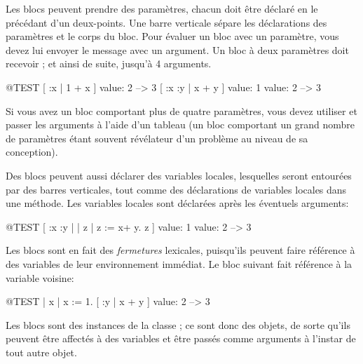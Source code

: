 \documentclass[a4paper,10pt,twoside]{book}
\begin{document}
Les blocs peuvent prendre des param\`etres, chacun doit \^etre
d\'eclar\'e en le précédant d'un deux-points.
Une barre verticale s\'{e}pare les d\'{e}clarations des param\`{e}tres
et le corps du bloc.
Pour \'evaluer un bloc avec un param\`{e}tre, vous devez lui envoyer le message 
  avec un argument.
Un bloc \`{a} deux param\`etres doit recevoir  ; et ainsi de suite, jusqu'\`a 4 arguments.

\begin{code}{@TEST}
[ :x | 1 + x ] value: 2 --> 3
[ :x :y | x + y ] value: 1 value: 2 --> 3
\end{code}

Si vous avez un bloc comportant plus de quatre param\`{e}tres, vous devez utiliser
 et passer les arguments à
l'aide d'un tableau (un bloc comportant un grand nombre de param\`{e}tres étant souvent r\'{e}v\'{e}lateur d'un probl\`{e}me au niveau de sa conception).

Des blocs peuvent aussi d\'{e}clarer des variables locales, lesquelles seront entour\'{e}es par des barres verticales, tout comme des d\'{e}clarations de variables locales dans une m\'{e}thode.
Les variables locales sont d\'{e}clar\'{e}es apr\`{e}s les éventuels
arguments:

\begin{code}{@TEST}
[ :x :y | | z | z := x+ y. z ] value: 1 value: 2 --> 3
\end{code}

Les blocs sont en fait des \emph{fermetures} lexicales, puisqu'ils
peuvent faire r\'ef\'erence \`a des variables de leur environnement
imm\'ediat. Le bloc suivant fait r\'ef\'erence \`a la variable  voisine:
\newpage
\begin{code}{@TEST}
| x |
x := 1.
[ :y | x + y ] value: 2 --> 3
\end{code}

Les blocs sont des instances de la classe ; ce
sont donc des objets, de sorte qu'ils peuvent \^{e}tre affect\'{e}s
\`{a} des variables et \^{e}tre pass\'{e}s comme arguments \`{a}
l'instar de tout autre objet.
\end{document}
